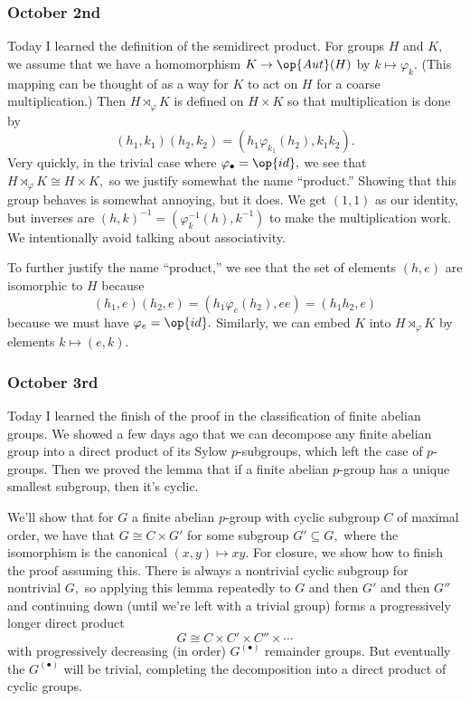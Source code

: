 \subsubsection{October 2nd}
Today I learned the definition of the semidirect product. For groups $H$ and $K,$ we assume that we have a homomorphism $K\to\op{Aut}(H)$ by $k\mapsto\varphi_k.$ (This mapping can be thought of as a way for $K$ to act on $H$ for a coarse multiplication.) Then $H\rtimes_\varphi K$ is defined on $H\times K$ so that multiplication is done by
\[(h_1,k_1)(h_2,k_2)=(h_1\varphi_{k_1}(h_2),k_1k_2).\]
Very quickly, in the trivial case where $\varphi_\bullet=\op{id},$ we see that $H\rtimes_\varphi K\cong H\times K,$ so we justify somewhat the name ``product.'' Showing that this group behaves is somewhat annoying, but it does. We get $(1,1)$ as our identity, but inverses are $(h,k)^{-1}=(\varphi^{-1}_k(h),k^{-1})$ to make the multiplication work. We intentionally avoid talking about associativity.

To further justify the name ``product,'' we see that the set of elements $(h,e)$ are isomorphic to $H$ because
\[(h_1,e)(h_2,e)=(h_1\varphi_e(h_2),ee)=(h_1h_2,e)\]
because we must have $\varphi_e=\op{id}.$ Similarly, we can embed $K$ into $H\rtimes_\varphi K$ by elements $k\mapsto(e,k).$

\subsubsection{October 3rd}
Today I learned the finish of the proof in the classification of finite abelian groups. We showed a few days ago that we can decompose any finite abelian group into a direct product of its Sylow $p$-subgroups, which left the case of $p$-groups. Then we proved the lemma that if a finite abelian $p$-group has a unique smallest subgroup, then it's cyclic.

We'll show that for $G$ a finite abelian $p$-group with cyclic subgroup $C$ of maximal order, we have that $G\cong C\times G'$ for some subgroup $G'\subseteq G,$ where the isomorphism is the canonical $(x,y)\mapsto xy.$ For closure, we show how to finish the proof assuming this. There is always a nontrivial cyclic subgroup for nontrivial $G,$ so applying this lemma repeatedly to $G$ and then $G'$ and then $G''$ and continuing down (until we're left with a trivial group) forms a progressively longer direct product
\[G\cong C\times C'\times C''\times\cdots\]
with progressively decreasing (in order) $G^{(\bullet)}$ remainder groups. But eventually the $G^{(\bullet)}$ will be trivial, completing the decomposition into a direct product of cyclic groups.

